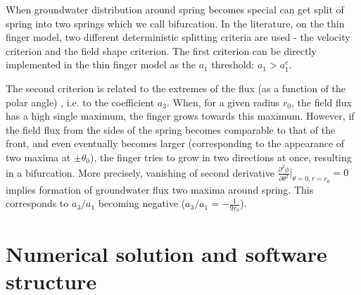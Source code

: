 \documentclass[]{pracamgr}
\begin{document}
    When groundwater distribution around spring becomes special can get split of spring into two springs which we call bifurcation. In the literature, on the thin finger model, two different deterministic splitting criteria are used - the velocity criterion and the field shape criterion. The first criterion can be directly implemented in the thin finger model as the $a_1$ threshold: $a_1 > a_1^c$.

    The second criterion is related to the extremes of the flux (as a function of the polar angle) \cite{petroff2013bifurcation, kaandorp2001algorithmic_Chapter4.4}, i.e. to the coefficient $a_3$. When, for a given radius $r_0$, the field flux has a high single maximum, the finger grows towards this maximum. However, if the field flux from the sides of the spring becomes comparable to that of the front, and even eventually becomes larger (corresponding to the appearance of two maxima at $\pm \theta_0$), the finger tries to grow in two directions at once, resulting in a bifurcation. More precisely, vanishing of second derivative $\frac{\partial^2 \phi}{\partial \theta^2}\big|_{\theta=0, r=r_0} = 0$ implies formation of groundwater flux two maxima around spring. This corresponds to $a_3/a_1$ becoming negative ($a_3/a_1 = -\frac{1}{9 r_0}$).

  \chapter{Numerical solution and software structure}
\end{document}
